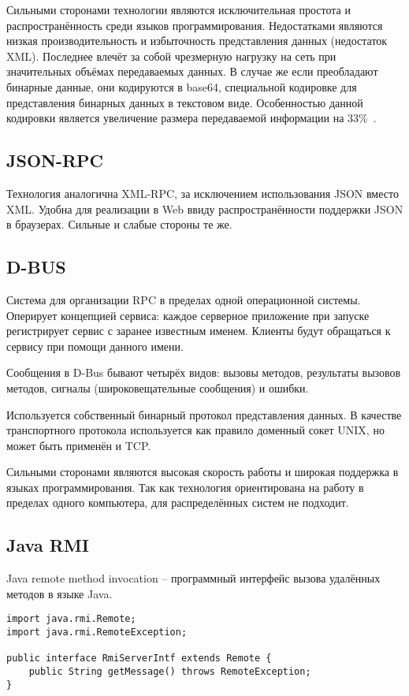 Сильными сторонами технологии являются исключительная простота
и распространённость среди языков программирования. Недостатками являются
низкая производительность и избыточность представления данных (недостаток XML).
Последнее влечёт за собой чрезмерную нагрузку на сеть при значительных объёмах
передаваемых данных. В случае же если преобладают бинарные данные,
они кодируются в base64, специальной кодировке для представления бинарных
данных в текстовом виде. Особенностью данной кодировки является увеличение
размера передаваемой информации на 33\%~\cite{base64rfc}.

\subsection{JSON-RPC}
Технология аналогична XML-RPC, за исключением использования JSON вместо XML.
Удобна для реализации в Web ввиду распространённости поддержки JSON
в браузерах. Сильные и слабые стороны те же.

\subsection{D-BUS}
Система для организации RPC в пределах одной операционной системы.
Оперирует концепцией сервиса: каждое серверное приложение при запуске
регистрирует сервис с заранее известным именем. Клиенты будут обращаться
к сервису при помощи данного имени.

Сообщения в D-Bus бывают четырёх видов: вызовы методов, результаты вызовов методов, сигналы (широковещательные сообщения) и ошибки.

Используется собственный бинарный протокол представления данных.
В качестве транспортного протокола используется как правило доменный сокет UNIX,
но может быть применён и TCP.

Сильными сторонами являются высокая скорость работы и широкая поддержка
в языках программирования. Так как технология ориентирована на работу
в пределах одного компьютера, для распределённых систем не подходит.

\subsection{Java RMI}
Java remote method invocation -- программный интерфейс вызова удалённых методов
в языке Java.
\begin{verbatim}
import java.rmi.Remote;
import java.rmi.RemoteException;

public interface RmiServerIntf extends Remote {
    public String getMessage() throws RemoteException;
}
\end{verbatim}


